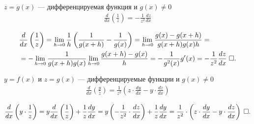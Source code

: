 \documentclass{article}
\begin{document}
\pagebreak

\theorem

$z=g(x)$ --- дифференцируемая функция и $g(x)\neq 0$
\begin{align*}
	\frac{d}{dx}\left(\frac{1}{z}\right)=-\frac{1}{z^{2}}\frac{dz}{dx}
\end{align*}

\proof
\begin{align*}
	 & \frac{d}{dx} \left(\frac{1}{z}\right) = \lim_{h \to 0} \frac{1}{h} \left(\frac{1}{g(x+h)} - \frac{1}{g(x)}\right)=\lim_{h \to 0}\frac{g(x)-g(x+h)}{g(x+h)g(x)h}= \\
	 & =-\lim_{h \to 0}\frac{1}{g(x+h)g(x)}\slim{h\to 0}\frac{g(x+h)-g(x)}{h}=-\frac{1}{g^{2}(x)}g'(x)=-\frac{1}{z^{2}}\frac{dz}{dx}\qed
\end{align*}

\theorem

$y=f(x)$ и $z=g(x)$ --- дифференцируемые функции и $g(x)\neq 0$
\begin{align*}
	\frac{d}{dx}\left(\frac{y}{z}\right)=\frac{1}{z^2} \left(z \cdot \frac{dy}{dx} - y \cdot \frac{dz}{dx}\right)
\end{align*}

\proof
\begin{align*}
	\frac{d}{dx} \left(y \cdot \frac{1}{z}\right) = y \frac{d}{dx} \left(\frac{1}{z}\right) + \frac{1}{z} \frac{dy}{dx} = y \left(-\frac{1}{z^2} \cdot \frac{dz}{dx}\right) + \frac{1}{z} \frac{dy}{dx} = \frac{1}{z^2} \cdot \left(z \cdot \frac{dy}{dx} - y \cdot \frac{dz}{dx}\right)\qed
\end{align*}

\pagebreak

\end{document}
